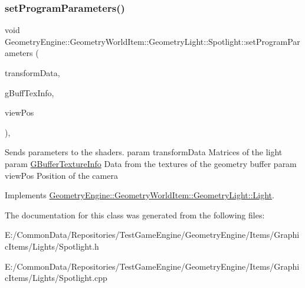 \subsubsection{\texorpdfstring{setProgramParameters()}{setProgramParameters()}}
{\footnotesize\ttfamily void Geometry\+Engine\+::\+Geometry\+World\+Item\+::\+Geometry\+Light\+::\+Spotlight\+::set\+Program\+Parameters (\begin{DoxyParamCaption}\item[{const \mbox{\hyperlink{class_geometry_engine_1_1_lighting_transformation_data}{Lighting\+Transformation\+Data}} \&}]{transform\+Data,  }\item[{const \mbox{\hyperlink{class_geometry_engine_1_1_g_buffer_texture_info}{G\+Buffer\+Texture\+Info}} \&}]{g\+Buff\+Tex\+Info,  }\item[{const Q\+Vector3D \&}]{view\+Pos }\end{DoxyParamCaption})\hspace{0.3cm}{\ttfamily [protected]}, {\ttfamily [virtual]}}

Sends parameters to the shaders. param transform\+Data Matrices of the light param \mbox{\hyperlink{class_geometry_engine_1_1_g_buffer_texture_info}{G\+Buffer\+Texture\+Info}} Data from the textures of the geometry buffer param view\+Pos Position of the camera 

Implements \mbox{\hyperlink{class_geometry_engine_1_1_geometry_world_item_1_1_geometry_light_1_1_light_a366be5945389fe58df4bf5aa8c43138f}{Geometry\+Engine\+::\+Geometry\+World\+Item\+::\+Geometry\+Light\+::\+Light}}.



The documentation for this class was generated from the following files\+:\begin{DoxyCompactItemize}
\item 
E\+:/\+Common\+Data/\+Repositories/\+Test\+Game\+Engine/\+Geometry\+Engine/\+Items/\+Graphic\+Items/\+Lights/Spotlight.\+h\item 
E\+:/\+Common\+Data/\+Repositories/\+Test\+Game\+Engine/\+Geometry\+Engine/\+Items/\+Graphic\+Items/\+Lights/Spotlight.\+cpp\end{DoxyCompactItemize}
